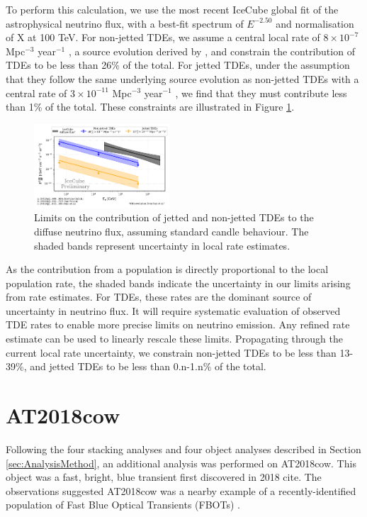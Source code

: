 \documentclass[twocolumn, tighten, linenumbers]{aastex62}
\begin{document}
To perform this calculation, we use the most recent IceCube global fit of the astrophysical neutrino flux, with a best-fit spectrum of $E^{-2.50}$ and normalisation of X at 100 TeV. For non-jetted TDEs, we assume a central local rate of $8 \times 10^{-7}$ Mpc$^{-3}$ year$^{-1}$ \citep{vanVelzen:2017qum}, a source evolution derived by \cite{Sun:2015bda}, and constrain the contribution of TDEs to be less than 26\% of the total. For jetted TDEs, under the assumption that they follow the same underlying source evolution as non-jetted TDEs with a central rate of $3 \times 10^{-11}$ Mpc$^{-3}$ year$^{-1}$ \citep{Sun:2015bda}, we find that they must contribute less than 1\% of the total.  These constraints are illustrated in Figure \ref{fig:DiffuseFlux}.

\begin{figure}[!ht]
	\centering \includegraphics[width=0.45\textwidth]{figures/diffuse_flux_global_fit}
	\caption{Limits on the contribution of jetted and non-jetted TDEs to the diffuse neutrino flux, assuming standard candle behaviour. The shaded bands represent uncertainty in local rate estimates.}
	\label{fig:DiffuseFlux}
\end{figure}

As the contribution from a population is directly proportional to the local population rate, the shaded bands indicate the uncertainty in our limits arising from rate estimates. For TDEs, these rates are the dominant source of uncertainty in neutrino flux. It will require systematic evaluation of observed TDE rates to enable more precise limits on neutrino emission. Any refined rate estimate can be used to linearly rescale these limits. Propagating through the current local rate uncertainty, we constrain non-jetted TDEs to be less than 13-39\%, and jetted TDEs to be less than 0.n-1.n\% of the total.

\section{AT2018cow}
\label{sec:AT2018cow}
Following the four stacking analyses and four object analyses described in Section \ref{sec:AnalysisMethod}, an additional analysis was performed on AT2018cow. This object
 was a fast, bright, blue transient first discovered in 2018 cite. The observations suggested AT2018cow was a nearby example of a recently-identified population of Fast Blue Optical Transients (FBOTs) \cite{Margutti:2018rri}. 
\end{document}
